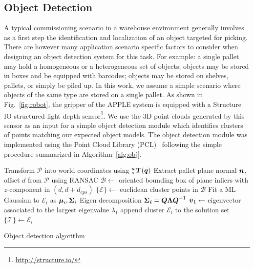 \subsection{Object Detection}
\label{subsec:obj_det}
%
A typical commissioning scenario in a warehouse environment generally involves as a first step the
identification and localization of an object targeted for picking. There are however many
application scenario specific factors to consider when designing an object detection system for this
task. For example: a single pallet may hold a homogeneous or a heterogeneous set of objects; objects
may be stored in boxes and be equipped with barcodes; objects may be stored on shelves, pallets, or
simply be piled up. In this work, we assume a simple scenario where objects of the same type are
stored on a single pallet. As shown in Fig.~\ref{fig:robot}, the gripper of the APPLE system is
equipped with a Structure IO structured light depth sensor\footnote{\url{http://structure.io/}}. We
use the 3D point clouds generated by this sensor as an input for a simple object detection module
which identifies clusters of points matching our expected object models. The object detection module
was implemented using the Point Cloud Library (PCL)~\cite{Rusu11} following the simple procedure
summarized in Algorithm~\ref{alg:obj}.
%
\begin{algorithm}[t!]
{}
Transform $\mathcal{P}$ into world coordinates using $^w_s\mbox{\boldmath $T$}(\mbox{\boldmath $q$})$\;
 {
    Extract pallet plane normal $\mbox{\boldmath $n$}$, offset $d$ from $\mathcal{P}$ using RANSAC\;
}
$\mathcal{B} \leftarrow$ oriented bounding box of plane inliers with $z$-component in $(d,d+d_{eps})$\;
$\{\mathcal{E}\} \leftarrow$ euclidean cluster points in $\mathcal{B}$\;
 {
    Fit a ML Gaussian to $\mathcal{E}_i$ as $\mbox{\boldmath $\mu$}_i,\mbox{\boldmath $\Sigma$}_i$\;
    Eigen decomposition $\mbox{\boldmath $\Sigma_i$}=\mbox{\boldmath $Q$}\mbox{\boldmath $\Lambda$}\mbox{\boldmath $Q$}^{-1}$\;
    $\mbox{\boldmath $v$}_1 \leftarrow$ eigenvector associated to the largest eigenvalue $\lambda_1$\;
     {append cluster
      $\mathcal{E}_i$ to the solution set $\{\mathcal{T}\}
      \leftarrow \mathcal{E}_i$\;}
}
\caption{Object detection algorithm}\label{alg:obj}
\end{algorithm}
